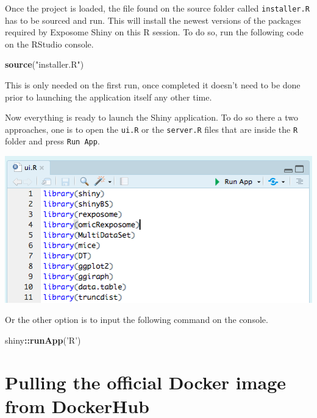 \documentclass[
]{book}
\newenvironment{Shaded}{\begin{snugshade}}{\end{snugshade}}
\newcommand{\KeywordTok}[1]{\textcolor[rgb]{0.13,0.29,0.53}{\textbf{#1}}}
\newcommand{\NormalTok}[1]{#1}
\newcommand{\OperatorTok}[1]{\textcolor[rgb]{0.81,0.36,0.00}{\textbf{#1}}}
\newcommand{\StringTok}[1]{\textcolor[rgb]{0.31,0.60,0.02}{#1}}
\begin{document}
Once the project is loaded, the file found on the source folder called \texttt{installer.R} has to be sourced and run. This will install the newest versions of the packages required by Exposome Shiny on this R session. To do so, run the following code on the RStudio console.

\begin{Shaded}
\begin{Highlighting}[]
\KeywordTok{source}\NormalTok{(}\StringTok{"installer.R"}\NormalTok{)}
\end{Highlighting}
\end{Shaded}

This is only needed on the first run, once completed it doesn't need to be done prior to launching the application itself any other time.

Now everything is ready to launch the Shiny application. To do so there a two approaches, one is to open the \texttt{ui.R} or the \texttt{server.R} files that are inside the \texttt{R} folder and press \texttt{Run\ App}.

\includegraphics{images/setup2.png}

Or the other option is to input the following command on the console.

\begin{Shaded}
\begin{Highlighting}[]
\NormalTok{shiny}\OperatorTok{::}\KeywordTok{runApp}\NormalTok{(}\StringTok{'R'}\NormalTok{)}
\end{Highlighting}
\end{Shaded}

\hypertarget{pulling-the-official-docker-image-from-dockerhub}{%
\section{Pulling the official Docker image from DockerHub}\label{pulling-the-official-docker-image-from-dockerhub}}
\end{document}
